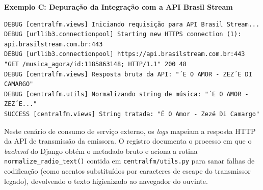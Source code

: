 \documentclass[12pt, openright, oneside, a4paper, brazil]{ads-unipac-abntex2}
\begin{document}
\begin{apendicesenv}
\vspace{0.5cm}

\textbf{Exemplo C: Depuração da Integração com a API Brasil Stream}
\begin{verbatim}
DEBUG [centralfm.views] Iniciando requisição para API Brasil Stream...
DEBUG [urllib3.connectionpool] Starting new HTTPS connection (1): 
api.brasilstream.com.br:443
DEBUG [urllib3.connectionpool] https://api.brasilstream.com.br:443 
"GET /musica_agora/id:1185863148; HTTP/1.1" 200 48
DEBUG [centralfm.views] Resposta bruta da API: "´E O AMOR - ZEZ´E DI CAMARGO"
DEBUG [centralfm.utils] Normalizando string de música: "´E O AMOR - ZEZ´E..."
SUCCESS [centralfm.views] String tratada: "É O Amor - Zezé Di Camargo"
\end{verbatim}

Neste cenário de consumo de serviço externo, os \textit{logs} mapeiam a resposta HTTP da API de transmissão da emissora. O registro documenta o processo em que o \textit{backend} do Django obtém o metadado bruto e aciona a rotina \texttt{normalize\_radio\_text()} contida em \texttt{centralfm/utils.py} para sanar falhas de codificação (como acentos substituídos por caracteres de escape do transmissor legado), devolvendo o texto higienizado ao navegador do ouvinte.

\end{apendicesenv}
\end{document}
